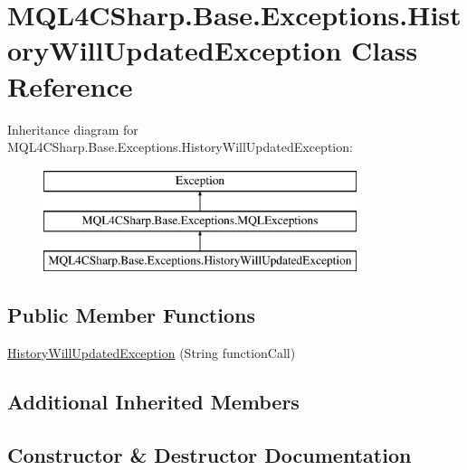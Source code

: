 \hypertarget{class_m_q_l4_c_sharp_1_1_base_1_1_exceptions_1_1_history_will_updated_exception}{}\section{M\+Q\+L4\+C\+Sharp.\+Base.\+Exceptions.\+History\+Will\+Updated\+Exception Class Reference}
\label{class_m_q_l4_c_sharp_1_1_base_1_1_exceptions_1_1_history_will_updated_exception}
Inheritance diagram for M\+Q\+L4\+C\+Sharp.\+Base.\+Exceptions.\+History\+Will\+Updated\+Exception\+:\begin{figure}[H]
\begin{center}
\leavevmode
\includegraphics[height=3.000000cm]{class_m_q_l4_c_sharp_1_1_base_1_1_exceptions_1_1_history_will_updated_exception}
\end{center}
\end{figure}
\subsection*{Public Member Functions}
\begin{DoxyCompactItemize}
\item 
\hyperlink{class_m_q_l4_c_sharp_1_1_base_1_1_exceptions_1_1_history_will_updated_exception_a0d9ea0825ada36889622499f54fb6dfa}{History\+Will\+Updated\+Exception} (String function\+Call)
\end{DoxyCompactItemize}
\subsection*{Additional Inherited Members}


\subsection{Constructor \& Destructor Documentation}
